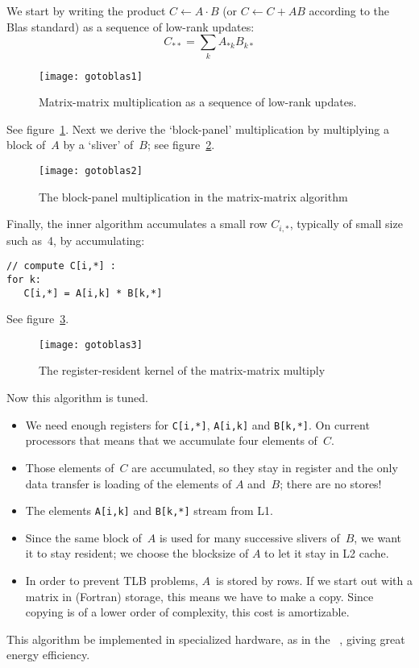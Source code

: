 We start by writing the product $C\leftarrow A\cdot B$ (or
  $C\leftarrow C+AB$ according to the Blas standard) as a sequence of
  low-rank updates:
\[ C_{**} = \sum_k  A_{*k}B_{k*} \]
\begin{figure}[ht]
\texttt{[image: gotoblas1]}
\caption{Matrix-matrix multiplication as a sequence of low-rank updates.}
\label{fig:goto1}
\end{figure}
See figure~\ref{fig:goto1}. Next we derive the `block-panel' multiplication
by multiplying a block of~$A$ by a `sliver' of~$B$; see figure~\ref{fig:goto2}.
\begin{figure}[ht]
\texttt{[image: gotoblas2]}  
\caption{The block-panel multiplication in the matrix-matrix algorithm}
\label{fig:goto2}
\end{figure}
Finally, the inner algorithm accumulates a small row $C_{i,*}$,
typically of small size such as~4, by accumulating:
\begin{verbatim}
// compute C[i,*] :
for k:
   C[i,*] = A[i,k] * B[k,*]
\end{verbatim}
See figure~\ref{fig:goto3}.
\begin{figure}[ht]
\texttt{[image: gotoblas3]}
\caption{The register-resident kernel of the matrix-matrix multiply}
\label{fig:goto3}
\end{figure}
Now this algorithm is tuned.
\begin{itemize}
\item We need enough registers for \verb+C[i,*]+, \verb+A[i,k]+ and
  \verb+B[k,*]+. On current processors that means that we accumulate
  four elements of~$C$.
\item Those elements of~$C$ are accumulated, so they stay in register
  and the only data transfer is loading of the elements of $A$
  and~$B$; there are no stores!
\item The elements \verb+A[i,k]+ and \verb+B[k,*]+ stream from L1.
\item Since the same block of~$A$ is used for many successive slivers
  of~$B$, we want it to stay resident; we choose the blocksize of $A$
  to let it stay in L2 cache.
\item In order to prevent TLB problems, $A$~is stored by rows. If we
  start out with a matrix in (Fortran) 
  storage, this means we have to make a copy. Since copying is of a
  lower order of complexity, this cost is amortizable.
\end{itemize}

This algorithm be implemented in specialized hardware, as in the
~\cite{GoogleTPUpage}, giving great energy efficiency.

